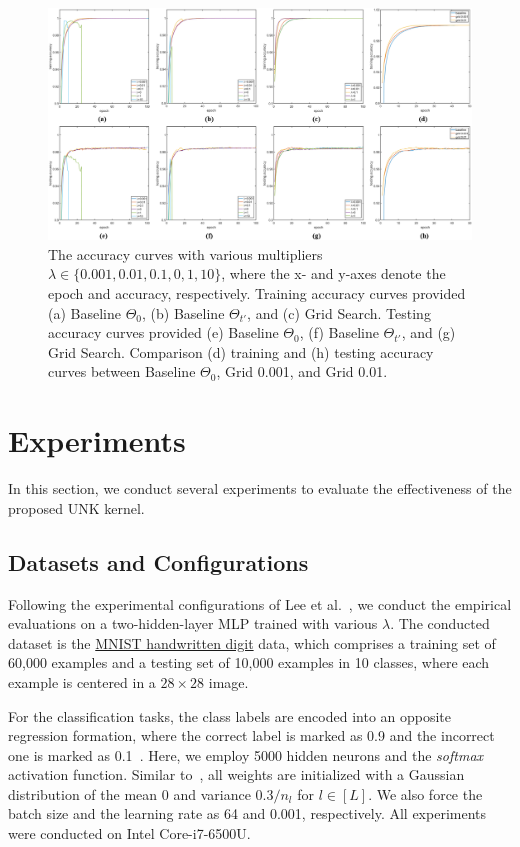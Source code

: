\documentclass[review,10pt]{JMtemplate}
\begin{document}
\begin{figure}[!htb]
\centering
\includegraphics[width=1\textwidth]{Figs/accuracy.png}
\caption{The accuracy curves with various multipliers $\lambda \in \{0.001, 0.01, 0.1, 0, 1, 10\}$, where the x- and y-axes denote the epoch and accuracy, respectively. Training accuracy curves provided (a) Baseline $\Theta_0$, (b) Baseline $\Theta_{t'}$, and (c) Grid Search. Testing accuracy curves provided (e) Baseline $\Theta_0$, (f) Baseline $\Theta_{t'}$, and (g) Grid Search. Comparison (d) training and (h) testing accuracy curves between Baseline $\Theta_0$, Grid 0.001, and Grid 0.01. }
\label{fig:accuracy}
\end{figure}
\section{Experiments}  \label{sec:experiments}
In this section, we conduct several experiments to evaluate the effectiveness of the proposed UNK kernel. 

\subsection{Datasets and Configurations}
Following the experimental configurations of Lee et al.~\citep{lee2018:NNGP}, we conduct the empirical evaluations on a two-hidden-layer MLP trained with various $\lambda$. The conducted dataset is the \href{http://yann.lecun.com/exdb/mnist/}{MNIST handwritten digit} data, which comprises a training set of 60,000 examples and a testing set of 10,000 examples in 10 classes, where each example is centered in a $28 \times 28$ image. 

For the classification tasks, the class labels are encoded into an opposite regression formation, where the correct label is marked as 0.9 and the incorrect one is marked as 0.1~\citep{zhang2022:NNGP}. Here, we employ 5000 hidden neurons and the \textit{softmax} activation function. Similar to~\citep{arora2019:NNGP}, all weights are initialized with a Gaussian distribution of the mean 0 and variance $0.3/n_l$ for $l \in [L]$. We also force the batch size and the learning rate as 64 and 0.001, respectively. All experiments were conducted on Intel Core-i7-6500U.
\end{document}
